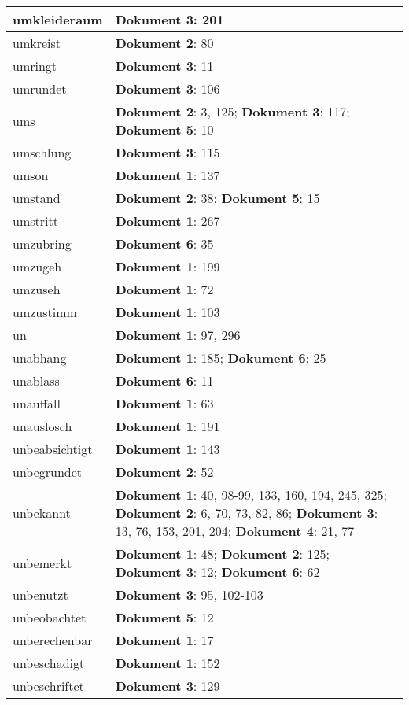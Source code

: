 \documentclass[a5paper]{article}
\begin{document}
\begin{longtable}[l]{|l|p{3in}|}
\hline
umkleideraum & \textbf{Dokument 3}: 201 \\
\hline
umkreist & \textbf{Dokument 2}: 80 \\
\hline
umringt & \textbf{Dokument 3}: 11 \\
\hline
umrundet & \textbf{Dokument 3}: 106 \\
\hline
ums & \textbf{Dokument 2}: 3, 125; \textbf{Dokument 3}: 117; \textbf{Dokument 5}: 10 \\
\hline
umschlung & \textbf{Dokument 3}: 115 \\
\hline
umson & \textbf{Dokument 1}: 137 \\
\hline
umstand & \textbf{Dokument 2}: 38; \textbf{Dokument 5}: 15 \\
\hline
umstritt & \textbf{Dokument 1}: 267 \\
\hline
umzubring & \textbf{Dokument 6}: 35 \\
\hline
umzugeh & \textbf{Dokument 1}: 199 \\
\hline
umzuseh & \textbf{Dokument 1}: 72 \\
\hline
umzustimm & \textbf{Dokument 1}: 103 \\
\hline
un & \textbf{Dokument 1}: 97, 296 \\
\hline
unabhang & \textbf{Dokument 1}: 185; \textbf{Dokument 6}: 25 \\
\hline
unablass & \textbf{Dokument 6}: 11 \\
\hline
unauffall & \textbf{Dokument 1}: 63 \\
\hline
unauslosch & \textbf{Dokument 1}: 191 \\
\hline
unbeabsichtigt & \textbf{Dokument 1}: 143 \\
\hline
unbegrundet & \textbf{Dokument 2}: 52 \\
\hline
unbekannt & \textbf{Dokument 1}: 40, 98-99, 133, 160, 194, 245, 325; \textbf{Dokument 2}: 6, 70, 73, 82, 86; \textbf{Dokument 3}: 13, 76, 153, 201, 204; \textbf{Dokument 4}: 21, 77 \\
\hline
unbemerkt & \textbf{Dokument 1}: 48; \textbf{Dokument 2}: 125; \textbf{Dokument 3}: 12; \textbf{Dokument 6}: 62 \\
\hline
unbenutzt & \textbf{Dokument 3}: 95, 102-103 \\
\hline
unbeobachtet & \textbf{Dokument 5}: 12 \\
\hline
unberechenbar & \textbf{Dokument 1}: 17 \\
\hline
unbeschadigt & \textbf{Dokument 1}: 152 \\
\hline
unbeschriftet & \textbf{Dokument 3}: 129 \\

\end{longtable}
\end{document}
